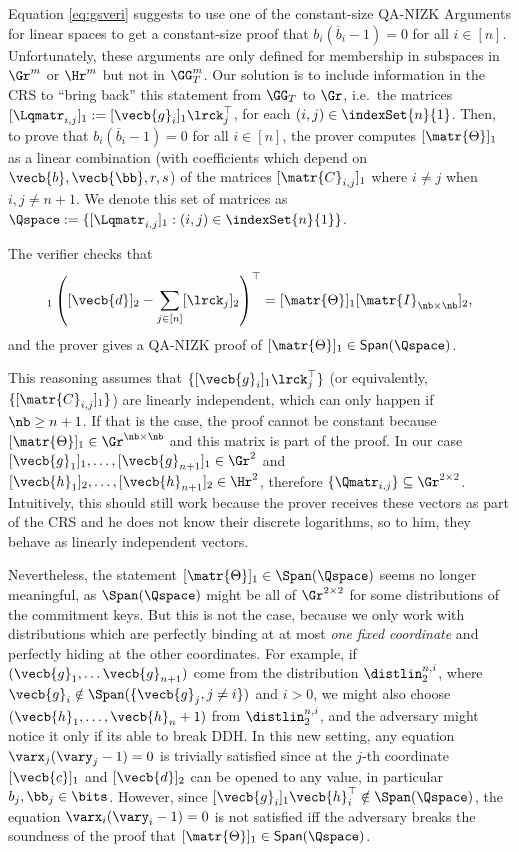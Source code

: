 Equation \ref{eq:gsveri} suggests to use one of the constant-size QA-NIZK Arguments for linear spaces to get a constant-size proof that $b_i(\overline{b}_i-1)=0$ for all $i \in [n]$. Unfortunately, these arguments are only defined for membership in subspaces  in 
$\Gr^m$ or $\Hr^m$ but not in $\GG_T^m$. Our solution is to include information in the CRS to ``bring back'' 
  this statement from $\GG_T$ to $\Gr$, i.e.\ 
  the matrices   $[\Lqmatr_{i,j}]_1:=[\vecb{g}_i]_1\lrck_j^{\top}$, for each $(i,j)\in\indexSet{n}{1}$.   
Then, to prove that $b_i(\overline{b}_i-1)=0$ for all $i\in [n]$, the prover computes 
$[\matr{\Theta}]_1$ as a linear combination (with coefficients which depend on
 $\vecb{b},\vecb{\bb},r,s$) of the matrices $[\matr{C}_{i,j}]_1$ where $i\neq j$ when $i,j\neq n+1$. We denote this set of matrices as
 $\Qspace:=\{[\Lqmatr_{i,j}]_1: (i,j)\in\indexSet{n}{1}\}$.

The verifier checks that
\begin{equation}
[\vecb{c}]_1\left([\vecb{d}]_2-
\sum_{j\in[n]}[\lrck_j]_2\right)^{\top}=
[\matr{\Theta}]_1[\matr{I}_{\nb\times\nb}]_2,
\end{equation}
 and the prover gives a QA-NIZK proof of  $[\matr{\Theta}]_1 \in \mathsf{Span}(\Qspace)$.

This reasoning assumes that $\{[\vecb{g}_i]_1 \lrck_j^{\top}\}$ (or equivalently, $\{[\matr{C}_{i,j}]_1\}$) are linearly independent,  which can only happen if 
$\nb \geq n+1$. If that is the case, the proof cannot be constant because $[\matr{\Theta}]_1 \in \Gr^{\nb\times\nb}$ and this matrix is part of the proof.
In our case $[\vecb{g}_1]_1,\ldots,[\vecb{g}_{n+1}]_1 \in \Gr^{2}$ and $[\vecb{h}_1]_2,\ldots,[\vecb{h}_{n+1}]_2 \in \Hr^{2}$, therefore 
$\{\Qmatr_{i,j}\} \subseteq \Gr^{2 \times 2}$.  Intuitively, this should still work because the prover receives these vectors as part of the CRS and he does not know their discrete logarithms, so to him, they behave as linearly independent vectors.  

Nevertheless, the statement $[\matr{\Theta}]_1\in\Span(\Qspace)$ seems no longer meaningful, as $\Span(\Qspace)$ might be all of $\Gr^{2\times 2}$ for some distributions of the commitment keys. But this is not the case, because we only work with distributions which are perfectly binding at at most \emph{one fixed coordinate} and perfectly hiding at the other coordinates. For example, if $(\vecb{g}_1,\ldots\vecb{g}_{n+1})$ come from the distribution $\distlin_2^{n,i}$, where $\vecb{g}_i\notin\Span(\{\vecb{g}_j, j\neq i\})$ and $i>0$, we might also choose $(\vecb{h}_1,\ldots,\vecb{h}_n+1)$ from $\distlin_2^{n,i}$, and the adversary might notice it only if its able to break DDH. In this new setting, any equation $\varx_j(\vary_j-1)=0$ is trivially satisfied since at the $j$-th coordinate $[\vecb{c}]_1$ and $[\vecb{d}]_2$ can be opened to any value, in particular $b_j,\bb_j\in\bits$. However, since $[\vecb{g}_i]_1\vecb{h}^\top_i\notin\Span(\Qspace)$, the equation $\varx_i(\vary_i-1)=0$ is not satisfied iff the adversary breaks the soundness of the proof that $[\matr{\Theta}]_1 \in \mathsf{Span}(\Qspace)$.
  
